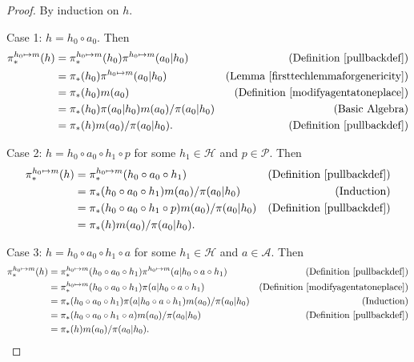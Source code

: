 \documentclass{article}
\begin{document}
\begin{proof}
    By induction on $h$.

    Case 1: $h=h_0\circ a_0$. Then
    \begin{align*}
        \pi^{h_0\mapsto m}_*(h)
        &= \pi^{h_0\mapsto m}_*(h_0)\pi^{h_0\mapsto m}(a_0|h_0)
            &\mbox{(Definition \ref{pullbackdef})}\\
        &= \pi_*(h_0)\pi^{h_0\mapsto m}(a_0|h_0)
            &\mbox{(Lemma \ref{firsttechlemmaforgenericity})}\\
        &= \pi_*(h_0)m(a_0)
            &\mbox{(Definition \ref{modifyagentatoneplace})}\\
        &= \pi_*(h_0)\pi(a_0|h_0)m(a_0)/\pi(a_0|h_0)
            &\mbox{(Basic Algebra)}\\
        &= \pi_*(h)m(a_0)/\pi(a_0|h_0).
            &\mbox{(Definition \ref{pullbackdef})}
    \end{align*}

    Case 2: $h=h_0\circ a_0\circ h_1\circ p$ for some $h_1\in\mathcal H$
        and $p\in\mathcal P$. Then
    \begin{align*}
        \pi^{h_0\mapsto m}_*(h)
        &= \pi^{h_0\mapsto m}_*(h_0\circ a_0\circ h_1)
            &\mbox{(Definition \ref{pullbackdef})}\\
        &= \pi_*(h_0\circ a_0\circ h_1)m(a_0)/\pi(a_0|h_0)
            &\mbox{(Induction)}\\
        &= \pi_*(h_0\circ a_0\circ h_1\circ p)m(a_0)/\pi(a_0|h_0)
            &\mbox{(Definition \ref{pullbackdef})}\\
        &= \pi_*(h)m(a_0)/\pi(a_0|h_0).
    \end{align*}

    Case 3: $h=h_0\circ a_0\circ h_1\circ a$ for some $h_1\in\mathcal H$ and
        $a\in\mathcal A$. Then
    \begin{align*}
        \pi^{h_0\mapsto m}_*(h)
        &= \pi^{h_0\mapsto m}_*(h_0\circ a_0\circ h_1)
            \pi^{h_0\mapsto m}(a|h_0\circ a\circ h_1)
            &\mbox{(Definition \ref{pullbackdef})}\\
        &= \pi^{h_0\mapsto m}_*(h_0\circ a_0\circ h_1)
            \pi(a|h_0\circ a\circ h_1)
            &\mbox{(Definition \ref{modifyagentatoneplace})}\\
        &= \pi_*(h_0\circ a_0\circ h_1)\pi(a|h_0\circ a\circ h_1)m(a_0)/\pi(a_0|h_0)
            &\mbox{(Induction)}\\
        &= \pi_*(h_0\circ a_0\circ h_1\circ a)m(a_0)/\pi(a_0|h_0)
            &\mbox{(Definition \ref{pullbackdef})}\\
        &= \pi_*(h)m(a_0)/\pi(a_0|h_0).
    \end{align*}
\end{proof}
\end{document}
